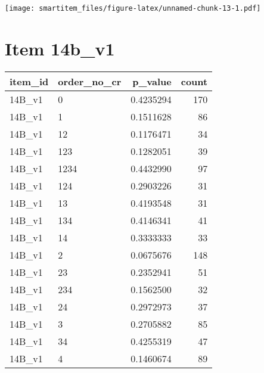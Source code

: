 \documentclass[]{book}
\newenvironment{Shaded}{\begin{snugshade}}{\end{snugshade}}
\newcommand{\KeywordTok}[1]{\textcolor[rgb]{0.13,0.29,0.53}{\textbf{#1}}}
\newcommand{\StringTok}[1]{\textcolor[rgb]{0.31,0.60,0.02}{#1}}
\newcommand{\OperatorTok}[1]{\textcolor[rgb]{0.81,0.36,0.00}{\textbf{#1}}}
\newcommand{\NormalTok}[1]{#1}
\theoremstyle{definition}
\theoremstyle{definition}
\theoremstyle{definition}
\theoremstyle{remark}
\begin{document}
\texttt{[image: smartitem\_files/figure-latex/unnamed-chunk-13-1.pdf]}

\section{Item 14b\_v1}\label{item-14b_v1-1}

\begin{Shaded}
\end{Shaded}

\begin{tabular}{l|l|r|r}
\hline
item\_id & order\_no\_cr & p\_value & count\\
\hline
14B\_v1 & 0 & 0.4235294 & 170\\
\hline
14B\_v1 & 1 & 0.1511628 & 86\\
\hline
14B\_v1 & 12 & 0.1176471 & 34\\
\hline
14B\_v1 & 123 & 0.1282051 & 39\\
\hline
14B\_v1 & 1234 & 0.4432990 & 97\\
\hline
14B\_v1 & 124 & 0.2903226 & 31\\
\hline
14B\_v1 & 13 & 0.4193548 & 31\\
\hline
14B\_v1 & 134 & 0.4146341 & 41\\
\hline
14B\_v1 & 14 & 0.3333333 & 33\\
\hline
14B\_v1 & 2 & 0.0675676 & 148\\
\hline
14B\_v1 & 23 & 0.2352941 & 51\\
\hline
14B\_v1 & 234 & 0.1562500 & 32\\
\hline
14B\_v1 & 24 & 0.2972973 & 37\\
\hline
14B\_v1 & 3 & 0.2705882 & 85\\
\hline
14B\_v1 & 34 & 0.4255319 & 47\\
\hline
14B\_v1 & 4 & 0.1460674 & 89\\
\hline
\end{tabular}
\end{document}
